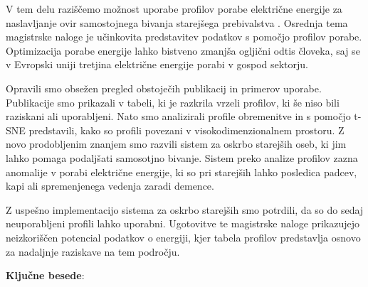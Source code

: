 \begin{sloabstract}
  \addchaptertocentry{\sloabstractname} %
  V tem delu raziščemo možnost uporabe profilov porabe električne energije za naslavljanje ovir samostojnega bivanja starejšega prebivalstva . 
  Osrednja tema magistrske naloge je učinkovita predstavitev podatkov s pomočjo profilov porabe.
  Optimizacija porabe energije lahko bistveno zmanjša ogljični odtis človeka, saj se v Evropski uniji tretjina električne energije porabi v gospod sektorju.
  
  Opravili smo obsežen pregled obstoječih publikacij in primerov uporabe.
  Publikacije smo prikazali v tabeli, ki je razkrila vrzeli profilov, ki še niso bili raziskani ali uporabljeni.
  Nato smo analizirali profile obremenitve in s pomočjo t-SNE predstavili, kako so profili povezani v visokodimenzionalnem prostoru. 
  Z novo prodobljenim znanjem smo razvili sistem za oskrbo starejših oseb, ki jim lahko pomaga podaljšati samosotjno bivanje.
  Sistem preko analize profilov zazna anomalije v porabi električne energije, ki so pri starejših lahko posledica padcev, kapi ali spremenjenega vedenja zaradi demence.
  
  Z uspešno implementacijo sistema za oskrbo starejših smo potrdili, da so do sedaj neuporabljeni profili lahko uporabni.
  Ugotovitve te magistrske naloge prikazujejo neizkoriščen potencial podatkov o energiji, kjer tabela profilov predstavlja osnovo za nadaljnje raziskave na tem področju.
    
  
    \par\textbf{Ključne besede}: \slokeywordnames 
  
  \end{sloabstract}